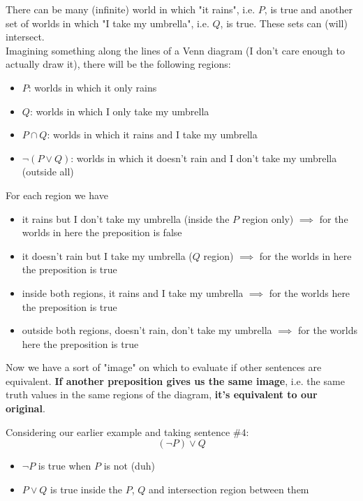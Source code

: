 \documentclass[11pt]{article}
\begin{document}
	There can be many (infinite) world in which "it rains", i.e. $P$, is true and another set of worlds in which "I take my umbrella", i.e. $Q$, is true. These sets can (will) intersect.\\
	
	Imagining something along the lines of a Venn diagram (I don't care enough to actually draw it), there will be the following regions:
	\begin{itemize}
		\item $P$: worlds in which it only rains
		\item $Q$: worlds in which I only take my umbrella
		\item $P \cap Q$: worlds in which it rains and I take my umbrella
		\item $ \neg (P \vee Q)$: worlds in which it doesn't rain and I don't take my umbrella (outside all)
	\end{itemize}
	
	For each region we have
	\begin{itemize}
		\item it rains but I don't take my umbrella (inside the $P$ region only) $\implies$ for the worlds in here the preposition is false
		\item it doesn't rain but I take my umbrella ($Q$ region) $\implies$ for the worlds in here the preposition is true
		\item inside both regions, it rains and I take my umbrella $\implies$ for the worlds here the preposition is true
		\item outside both regions, doesn't rain, don't take my umbrella $\implies$ for the worlds here the preposition is true
	\end{itemize}
	Now we have a sort of "image" on which to evaluate if other sentences are equivalent. \textbf{If another preposition gives us the same image}, i.e. the same truth values in the same regions of the diagram, \textbf{it's equivalent to our original}.\\
	
	
	\newpage
	
	Considering our earlier example and taking sentence $\#4$:
	$$ (\neg P) \vee Q $$
	\begin{itemize}
		\item $\neg P$ is true when $P$ is not (duh)
		\item $P \vee Q$ is true inside the $P$, $Q$ and intersection region between them
	\end{itemize}
	
\end{document}
